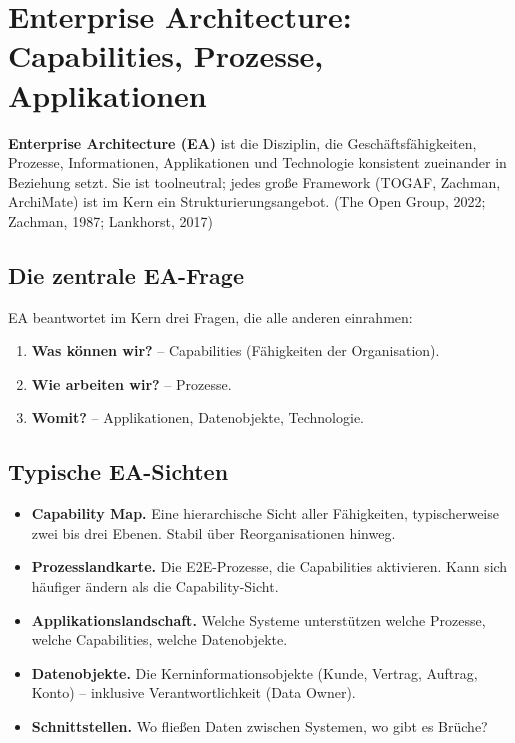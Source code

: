 \documentclass[11pt,a4paper,oneside]{article}
\newcommand{\fachbegriff}[1]{\textbf{#1}}
\newcommand{\quelle}[1]{{\footnotesize\color{lpGray}(#1)}}
\begin{document}
\section{Enterprise Architecture: Capabilities, Prozesse, Applikationen}

\fachbegriff{Enterprise Architecture (EA)} ist die Disziplin, die Geschäftsfähigkeiten, Prozesse, Informationen, Applikationen und Technologie konsistent zueinander in Beziehung setzt. Sie ist toolneutral; jedes große Framework (TOGAF, Zachman, ArchiMate) ist im Kern ein Strukturierungsangebot. \quelle{The Open Group, 2022; Zachman, 1987; Lankhorst, 2017}

\subsection{Die zentrale EA-Frage}

EA beantwortet im Kern drei Fragen, die alle anderen einrahmen:

\begin{enumerate}
  \item \textbf{Was können wir?} -- Capabilities (Fähigkeiten der Organisation).
  \item \textbf{Wie arbeiten wir?} -- Prozesse.
  \item \textbf{Womit?} -- Applikationen, Datenobjekte, Technologie.
\end{enumerate}

\subsection{Typische EA-Sichten}

\begin{itemize}
  \item \fachbegriff{Capability Map.} Eine hierarchische Sicht aller Fähigkeiten, typischerweise zwei bis drei Ebenen. Stabil über Reorganisationen hinweg.
  \item \fachbegriff{Prozesslandkarte.} Die E2E-Prozesse, die Capabilities aktivieren. Kann sich häufiger ändern als die Capability-Sicht.
  \item \fachbegriff{Applikationslandschaft.} Welche Systeme unterstützen welche Prozesse, welche Capabilities, welche Datenobjekte.
  \item \fachbegriff{Datenobjekte.} Die Kerninformationsobjekte (Kunde, Vertrag, Auftrag, Konto) -- inklusive Verantwortlichkeit (Data Owner).
  \item \fachbegriff{Schnittstellen.} Wo fließen Daten zwischen Systemen, wo gibt es Brüche?
\end{itemize}
\end{document}

